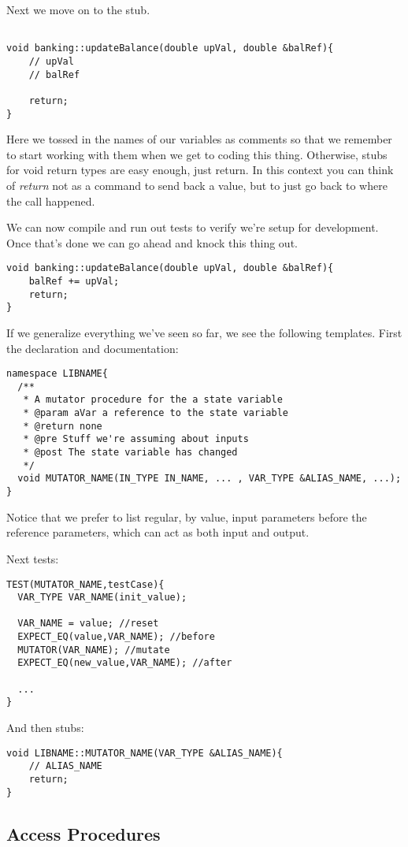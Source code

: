\documentclass[]{tufte-handout}
\begin{document}
Next we move on to the stub.
\begin{verbatim}

void banking::updateBalance(double upVal, double &balRef){
    // upVal
	// balRef

	return;
}

\end{verbatim}
Here we tossed in the names of our variables as comments so that we remember to start working with them when we get to coding this thing. Otherwise, stubs for void return types are easy enough, just return.  In this context you can think of \textit{return} not as a command to send back a value, but to just go back to where the call happened.  

We can now compile and run out tests to verify we're setup for development. Once that's done we can go ahead and knock this thing out.
\begin{verbatim}
void banking::updateBalance(double upVal, double &balRef){
	balRef += upVal;
	return;
}
\end{verbatim}

If we generalize everything we've seen so far, we see the following templates. First the declaration and documentation:
\begin{verbatim}
namespace LIBNAME{
  /**
   * A mutator procedure for the a state variable
   * @param aVar a reference to the state variable
   * @return none
   * @pre Stuff we're assuming about inputs
   * @post The state variable has changed
   */
  void MUTATOR_NAME(IN_TYPE IN_NAME, ... , VAR_TYPE &ALIAS_NAME, ...);
}
\end{verbatim}
Notice that we prefer to list regular, by value, input parameters before the reference parameters, which can act as both input and output.

Next tests: 
\begin{verbatim}
TEST(MUTATOR_NAME,testCase){
  VAR_TYPE VAR_NAME(init_value);

  VAR_NAME = value; //reset
  EXPECT_EQ(value,VAR_NAME); //before
  MUTATOR(VAR_NAME); //mutate
  EXPECT_EQ(new_value,VAR_NAME); //after

  ...
}
\end{verbatim}


And then stubs:
\begin{verbatim}
void LIBNAME::MUTATOR_NAME(VAR_TYPE &ALIAS_NAME){
	// ALIAS_NAME	
	return;
}
\end{verbatim} 

\subsection{Access Procedures}
\end{document}
